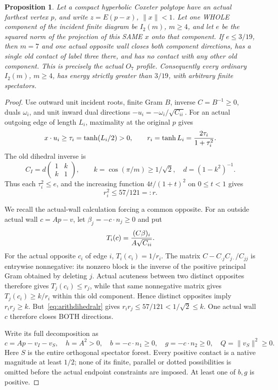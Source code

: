 \documentclass[11pt]{article}
\newtheorem{proposition}[theorem]{Proposition}
\begin{document}
\begin{proposition}\label{prop:ordinarydihedralthreenineteenths}
Let a compact hyperbolic Coxeter polytope have an actual farthest
vertex \(p\), and write \(z=E(p-x)\), \(\|x\|<1\).
Let one WHOLE component of the incident finite diagram be
\(I_2(m)\), \(m\ge4\), and let \(e\) be the squared norm of the
projection of this SAME \(x\) onto that component.
If \(e\le3/19\), then \(m=7\) and one actual opposite wall
closes both component directions, has a single old contact of
label three there, and has no contact with any other old component.
This is precisely the actual \(O_7\) profile.
Consequently every ordinary \(I_2(m)\), \(m\ge4\), has energy
strictly greater than \(3/19\), with arbitrary finite spectators.
\end{proposition}

\begin{proof}
Use outward unit incident roots, finite Gram \(B\), inverse
\(C=B^{-1}\ge0\), duals \(\omega_i\), and unit inward dual
directions \(-u_i=-\omega_i/\sqrt{C_{ii}}\).
For an actual outgoing edge of length \(L_i\), maximality at
the original \(p\) gives
\[
 x\cdot u_i\ge\tau_i=\tanh(L_i/2)>0,\qquad
 r_i=\tanh L_i={2\tau_i\over1+\tau_i^2}.
\]
The old dihedral inverse is
\[
 C_I=d\begin{pmatrix}1&k\\k&1\end{pmatrix},\qquad
 k=\cos(\pi/m)\ge1/\sqrt2,\quad d=(1-k^2)^{-1}.
\]
Thus each \(\tau_i^2\le e\), and the increasing function
\(4t/(1+t)^2\) on \(0\le t<1\) gives
\[
                         r_i^2\le57/121=:r .
\tag{Dih1}\label{eq:arithdihedralr}
\]

We recall the actual-wall calculation forcing a common opposite.
For an outside actual wall \(c=Ap-v\), let
\(\beta_j=-c\cdot n_j\ge0\) and put
\[
 T_i(c)={(C\beta)_i\over A\sqrt{C_{ii}}}.
\]
For the actual opposite \(c_i\) of edge \(i\),
\(T_i(c_i)=1/r_i\).
The matrix
\(C-C_{\cdot j}C_{j\cdot}/C_{jj}\)
is entrywise nonnegative: its nonzero block is the inverse of
the positive principal Gram obtained by deleting \(j\).
Actual acuteness between two distinct opposites therefore gives
\(T_j(c_i)\le r_j\), while that same nonnegative matrix gives
\(T_j(c_i)\ge k/r_i\) within this old component.
Hence distinct opposites imply \(r_ir_j\ge k\).
But~\eqref{eq:arithdihedralr} gives
\(r_ir_j\le57/121<1/\sqrt2\le k\).
One actual wall \(c\) therefore closes BOTH directions.

Write its full decomposition as
\[
 c=Ap-v_I-v_S,\quad h=A^2>0,\quad
 b=-c\cdot n_1\ge0,\quad g=-c\cdot n_2\ge0,\quad
 Q=\|v_S\|^2\ge0 .
\]
Here \(S\) is the entire orthogonal spectator forest.
Every positive contact is a native magnitude at least \(1/2\);
none of its finite, parallel or dotted possibilities is omitted
before the actual endpoint constraints are imposed.
At least one of \(b,g\) is positive.


\end{proof}
\end{document}
